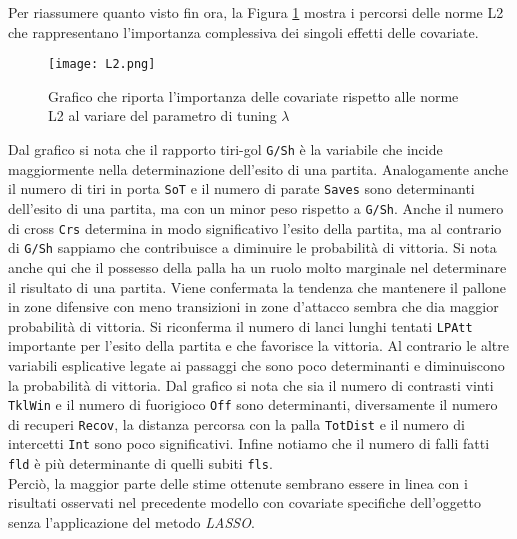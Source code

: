 Per riassumere quanto visto fin ora, la Figura \ref{fig:l2BTCL} mostra i percorsi delle norme L2 che rappresentano l'importanza complessiva dei singoli effetti delle covariate.

\begin{figure}[htbp]
	\begin{center}
		\texttt{[image: L2.png]}
		\caption{Grafico che riporta l'importanza delle covariate rispetto alle norme L2 al variare del parametro di tuning $\lambda$} \label{fig:l2BTCL}
	\end{center}
\end{figure}
Dal grafico si nota che il rapporto tiri-gol \texttt{G/Sh} è la variabile che incide maggiormente nella determinazione dell'esito di una partita. Analogamente anche il numero di tiri in porta \texttt{SoT} e il numero di parate \texttt{Saves} sono determinanti dell'esito di una partita, ma con un minor peso rispetto a \texttt{G/Sh}. Anche il numero di cross \texttt{Crs} determina in modo significativo l'esito della partita, ma al contrario di \texttt{G/Sh} sappiamo che contribuisce a diminuire le probabilità di vittoria. Si nota anche qui che il possesso della palla ha un ruolo molto marginale nel determinare il risultato di una partita. Viene confermata la tendenza che mantenere il pallone in zone difensive con meno transizioni in zone d'attacco sembra che dia maggior probabilità di vittoria. Si riconferma il numero di lanci lunghi tentati \texttt{LPAtt} importante per l'esito della partita e che favorisce la vittoria. Al contrario le altre variabili esplicative legate ai passaggi che sono poco determinanti e diminuiscono la probabilità di vittoria. Dal grafico si nota che sia il numero di contrasti vinti \texttt{TklWin} e il numero di fuorigioco \texttt{Off} sono determinanti, diversamente il numero di recuperi \texttt{Recov}, la distanza percorsa con la palla \texttt{TotDist} e il numero di intercetti \texttt{Int} sono poco significativi. Infine notiamo che il numero di falli fatti \texttt{fld} è più determinante di quelli subiti \texttt{fls}.\\
Perciò, la maggior parte delle stime ottenute sembrano essere in linea con i risultati osservati nel precedente modello con covariate specifiche dell'oggetto senza l'applicazione del metodo \emph{LASSO}.

